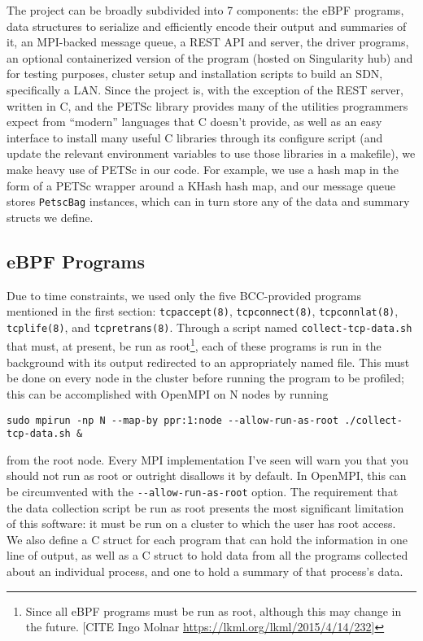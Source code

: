 
The project can be broadly subdivided into 7 components: the eBPF programs, data structures to serialize and efficiently encode their output and summaries of it, an MPI-backed message queue, a REST API and server, the driver programs, an optional containerized version of the program (hosted on Singularity hub) and for testing purposes, cluster setup and installation scripts to build an SDN, specifically a LAN. Since the project is, with the exception of the REST server, written in C, and the PETSc library provides many of the utilities programmers expect from ``modern'' languages that C doesn't provide, as well as an easy interface to install many useful C libraries through its configure script (and update the relevant environment variables to use those libraries in a makefile), we make heavy use of PETSc in our code. For example, we use a hash map in the form of a PETSc wrapper around a KHash hash map, and our message queue stores \lstinline{PetscBag} instances, which can in turn store any of the data and summary structs we define.
\subsection*{eBPF Programs}
Due to time constraints, we used only the five BCC-provided programs mentioned in the first section: \lstinline{tcpaccept(8)}, \lstinline{tcpconnect(8)}, \lstinline{tcpconnlat(8)}, \lstinline{tcplife(8)}, and \lstinline{tcpretrans(8)}. Through a script named \lstinline{collect-tcp-data.sh} that must, at present, be run as root\footnote{Since all eBPF programs must be run as root, although this may change in the future. [CITE Ingo Molnar \url{https://lkml.org/lkml/2015/4/14/232}]}, each of these programs is run in the background with its output redirected to an appropriately named file. This must be done on every node in the cluster before running the program to be profiled; this can be accomplished with OpenMPI on N nodes by running
\begin{Verbatim}
sudo mpirun -np N --map-by ppr:1:node --allow-run-as-root ./collect-tcp-data.sh &
\end{Verbatim}
from the root node. Every MPI implementation I've seen will warn you that you should not run as root or outright disallows it by default. In OpenMPI, this can be circumvented with the \lstinline{--allow-run-as-root} option. The requirement that the data collection script be run as root presents the most significant limitation of this software: it must be run on a cluster to which the user has root access. \\
We also define a C struct for each program that can hold the information in one line of output, as well as a C struct to hold data from all the programs collected about an individual process, and one to hold a summary of that process's data.
